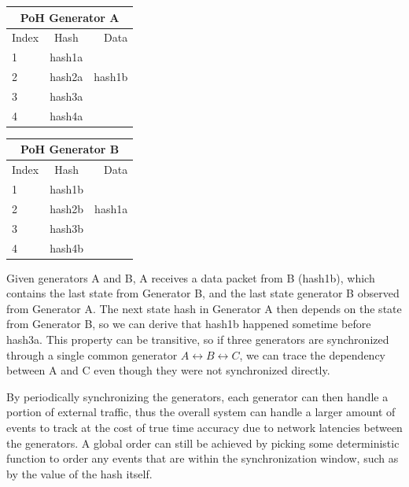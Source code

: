 \documentclass[12pt]{article}
\begin{document}
\begin{center}
  \begin{tabular}{ | l | c | r |}
    \hline
    \multicolumn{3}{|c|}{PoH Generator A} \\
    \hline
    Index & Hash & Data \\ \hline
    1 & hash1a & \\ \hline
    2 & hash2a & hash1b \\ \hline
    3 & hash3a & \\ \hline
    4 & hash4a & \\
    \hline
    \end{tabular}
  \begin{tabular}{ | l | c | r |}
    \hline
    \multicolumn{3}{|c|}{PoH Generator B} \\
    \hline
    Index & Hash & Data \\ \hline
    1 & hash1b & \\ \hline
    2 & hash2b & hash1a \\ \hline
    3 & hash3b & \\ \hline
    4 & hash4b & \\
    \hline
    \end{tabular}
\end{center}

Given generators A and B, A receives a data packet from B (hash1b), which contains the last state from Generator B, and the last state generator B observed from Generator A. The next state hash in Generator A then depends on the state from Generator B, so we can derive that hash1b happened sometime before hash3a. This property can be transitive, so if three generators are synchronized through a single common generator \(A \leftrightarrow B \leftrightarrow C\), we can trace the dependency between A and C even though they were not synchronized directly.

By periodically synchronizing the generators, each generator can then handle a portion of external traffic, thus the overall system can handle a larger amount of events to track at the cost of true time accuracy due to network latencies between the generators.  A global order can still be achieved by picking some deterministic function to order any events that are within the synchronization window, such as by the value of the hash itself.
\end{document}
